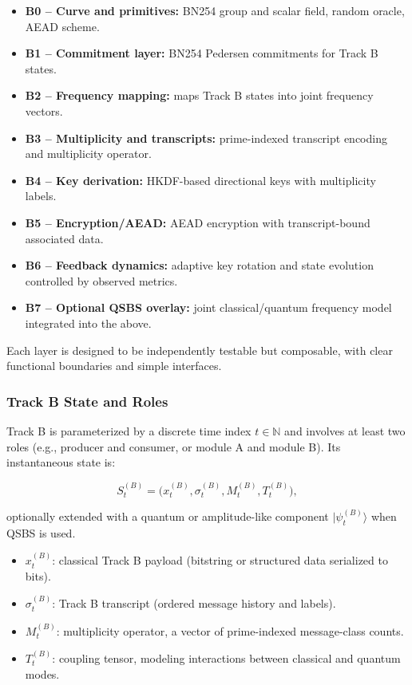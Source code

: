\documentclass[11pt]{article}
\newcommand{\N}{\mathbb{N}}
\begin{document}
\begin{itemize}[leftmargin=1.5em]
  \item \textbf{B0 -- Curve and primitives:} BN254 group and scalar field, random oracle, AEAD scheme.
  \item \textbf{B1 -- Commitment layer:} BN254 Pedersen commitments for Track B states.
  \item \textbf{B2 -- Frequency mapping:} maps Track B states into joint frequency vectors.
  \item \textbf{B3 -- Multiplicity and transcripts:} prime-indexed transcript encoding and multiplicity operator.
  \item \textbf{B4 -- Key derivation:} HKDF-based directional keys with multiplicity labels.
  \item \textbf{B5 -- Encryption/AEAD:} AEAD encryption with transcript-bound associated data.
  \item \textbf{B6 -- Feedback dynamics:} adaptive key rotation and state evolution controlled by observed metrics.
  \item \textbf{B7 -- Optional QSBS overlay:} joint classical/quantum frequency model integrated into the above.
\end{itemize}

Each layer is designed to be independently testable but composable, with clear functional boundaries and simple interfaces.

\subsubsection{Track B State and Roles}

Track B is parameterized by a discrete time index \(t \in \N\) and involves at least two roles (e.g., producer and consumer, or module A and module B).
Its instantaneous state is:

\[
  S_t^{(B)} = \bigl(x_t^{(B)}, \sigma_t^{(B)}, M_t^{(B)}, T_t^{(B)}\bigr),
\]

optionally extended with a quantum or amplitude-like component \(|\psi_t^{(B)}\rangle\) when QSBS is used.

\begin{itemize}[leftmargin=1.5em]
  \item \(x_t^{(B)}\): classical Track B payload (bitstring or structured data serialized to bits).
  \item \(\sigma_t^{(B)}\): Track B transcript (ordered message history and labels).
  \item \(M_t^{(B)}\): multiplicity operator, a vector of prime-indexed message-class counts.
  \item \(T_t^{(B)}\): coupling tensor, modeling interactions between classical and quantum modes.
\end{itemize}
\end{document}
